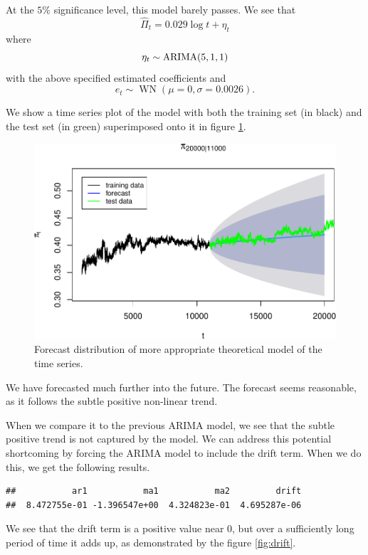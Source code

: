 \documentclass[final,
  11pt,
]{article}
\begin{document}
At the \(5\%\) significance level, this model barely passes. We see that
\[
  \hat{\Pi}_t = 0.029 \log t + \eta_t
\] where \[
  \eta_t \sim \operatorname{ARIMA}(5,1,1)
\] with the above specified estimated coefficients and \[
  e_t \sim \operatorname{WN}(\mu=0,\sigma=0.0026).
\]

We show a time series plot of the model with both the training set (in
black) and the test set (in green) superimposed onto it in figure \ref{fig:theory}.

\begin{figure}
\includegraphics{paper_files/figure-latex/unnamed-chunk-20-1.pdf}
\caption{Forecast distribution of more appropriate theoretical model
of the time series.}
\label{fig:theory}
\end{figure}

We have forecasted much further into the future. The forecast seems
reasonable, as it follows the subtle positive non-linear trend.

When we compare it to the previous ARIMA model, we see that the subtle
positive trend is not captured by the model. We can address this
potential shortcoming by forcing the ARIMA model to include the drift
term. When we do this, we get the following results.

\begin{verbatim}
##           ar1           ma1           ma2         drift 
##  8.472755e-01 -1.396547e+00  4.324823e-01  4.695287e-06
\end{verbatim}

We see that the drift term is a positive value near \(0\), but over a
sufficiently long period of time it adds up, as demonstrated by the
figure \ref{fig:drift}.
\end{document}
